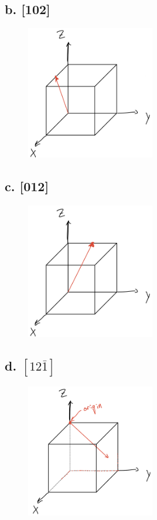 \documentclass{article}
\begin{document}
\subsection*{b. [102]}

\begin{figure}[H]
    \centering
    \includegraphics[width=0.5\textwidth]{3b.png}
\end{figure}


\subsection*{c. [012]}

\begin{figure}[H]
    \centering
    \includegraphics[width=0.5\textwidth]{3c.png}
\end{figure}

\subsection*{d. \small $\left[ 12\bar{1} \right]$}

\begin{figure}[H]
    \centering
    \includegraphics[width=0.5\textwidth]{3d.png}
\end{figure}
\end{document}

